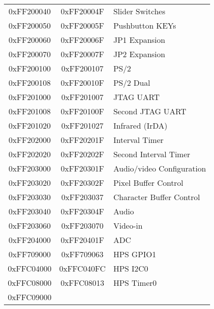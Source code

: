 \begin{table}[h]
\begin{center}
\begin{tabular}{c|c|l}
        \\
            0xFF200040
            & 0xFF20004F
            & Slider Switches
        \\
            0xFF200050
            & 0xFF20005F
            & Pushbutton KEYs
        \\
            0xFF200060
            & 0xFF20006F
            & JP1 Expansion
        \\
            0xFF200070
            & 0xFF20007F
            & JP2 Expansion
        \\
            0xFF200100
            & 0xFF200107
            & PS/2
        \\
            0xFF200108
            & 0xFF20010F
            & PS/2 Dual
        \\
            0xFF201000
            & 0xFF201007
            & JTAG UART
        \\
            0xFF201008
            & 0xFF20100F
            & Second JTAG UART
        \\
            0xFF201020
            & 0xFF201027
				& Infrared (IrDA)
        \\
            0xFF202000
            & 0xFF20201F
            & Interval Timer
        \\
            0xFF202020
            & 0xFF20202F
            & Second Interval Timer
        \\
            0xFF203000
            & 0xFF20301F
            & Audio/video Configuration
        \\
            0xFF203020
            & 0xFF20302F
            & Pixel Buffer Control
        \\
            0xFF203030
            & 0xFF203037
            & Character Buffer Control
        \\
            0xFF203040
            & 0xFF20304F
            & Audio
        \\
            0xFF203060
            & 0xFF203070
            & Video-in
        \\
            0xFF204000
            & 0xFF20401F
            & ADC
        \\
            0xFF709000
            & 0xFF709063
            & HPS GPIO1
        \\
            0xFFC04000
            & 0xFFC040FC
            & HPS I2C0
        \\
            0xFFC08000
            & 0xFFC08013
            & HPS Timer0
        \\
            0xFFC09000

\end{tabular}
\end{center}
\end{table}
